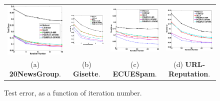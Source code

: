 \documentclass[10pt, conference, compsocconf]{IEEEtran}
\begin{document}
\begin{figure}[tb]
\begin{center}
\begin{tabular}{cccc}
   \includegraphics[height=4.cm,width=4.5cm]{img/20NewsGroup_accuracy_iteration.eps}&
   \hspace{-0.6cm}\includegraphics[height=4.cm,width=4.5cm]{img/Gisette_accuracy_iteration.eps}&
   \hspace{-0.6cm}\includegraphics[height=4.cm,width=4.5cm]{img/ECUESpam_accuracy_iteration.eps}&
   \hspace{-0.6cm}\includegraphics[height=4.cm,width=4.5cm]{img/URL-Reputation_accuracy_iteration.eps}\\
   (a) \textbf{20NewsGroup}. & \hspace{-0.3cm}(b) \textbf{Gisette}. & \hspace{-0.3cm}(c) \textbf{ECUESpam}. & \hspace{-0.3cm}(d) \textbf{URL-Reputation}.\\
   \end{tabular}
\end{center}\vspace{-0.4cm}
   \caption{Test error, as a function of iteration number.}\vspace{-0.5cm}
\label{fig:accuracy}
\end{figure}
\end{document}
